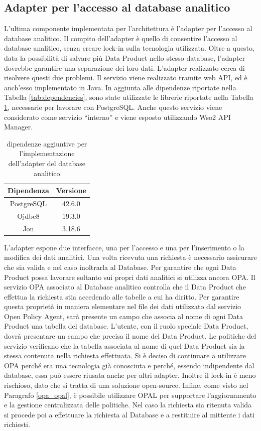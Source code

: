 \documentclass[12pt]{report}
\begin{document}
\subsection{Adapter per l'accesso al database analitico}
L'ultima componente implementata per l'architettura è l'adapter per l'accesso al database analitico.
Il compito dell'adapter è quello di consentire l'accesso al database analitico, senza creare lock-in sulla tecnologia utilizzata.
Oltre a questo, data la possibilità di salvare più Data Product nello stesso database, l'adapter dovrebbe garantire una separazione dei loro dati.
L'adapter realizzato cerca di risolvere questi due problemi.
Il servizio viene realizzato tramite web API, ed è anch'esso implementato in Java.
In aggiunta alle dipendenze riportate nella Tabella \ref{tab:dependencies}, sono state utilizzate le librerie riportate nella Tabella \ref{tab:dependencies2}, necessarie per lavorare con PostgreSQL.
Anche questo servizio viene considerato come servizio ``interno'' e viene esposto utilizzando Wso2 API Manager.
\begin{table}
    \centering
    \begin{tabular}{|c|c|}
        \hline
        Dipendenza & Versione \\
        \hline
        PostgreSQL & 42.6.0 \\
        Ojdbc8 & 19.3.0 \\
        Jon & 3.18.6 \\
        \hline
    \end{tabular}
        \caption{dipendenze aggiuntive per l'implementazione dell'adapter del database analitico}
        \label{tab:dependencies2}
\end{table}
L'adapter espone due interfacce, una per l'accesso e una per l'inserimento o la modifica dei dati analitici.
Una volta ricevuta una richiesta è necessario assicurare che sia valida e nel caso inoltrarla al Database.
Per garantire che ogni Data Product possa lavorare soltanto sui propri dati analitici si utilizza ancora OPA.
Il servizio OPA associato al Database analitico controlla che il Data Product che effettua la richiesta stia accedendo alle tabelle a cui ha diritto.
Per garantire questa proprietà in maniera elementare nel file dei dati utilizzato dal servizio Open Policy Agent, sarà presente un campo che associa al nome di ogni Data Product una tabella del database.
L'utente, con il ruolo speciale Data Product, dovrà presentare un campo che precisa il nome del Data Product.
Le politiche del servizio verificano che la tabella associata al nome di quel Data Product sia la stessa contenuta nella richiesta effettuata.
Si è deciso di continuare a utilizzare OPA perché era una tecnologia già conosciuta e perché, essendo indipendente dal database, essa può essere riusata anche per altri adapter.
Inoltre il lock-in è meno rischioso, dato che si tratta di una soluzione open-source. 
Infine, come visto nel Paragrafo \ref{opa_opal}, è possibile utilizzare OPAL per supportare l'aggiornamento e la gestione centralizzata delle politiche.
Nel caso la richiesta sia ritenuta valida si procede poi a effettuare la richiesta al Database e a restituire al mittente i dati richiesti.
\end{document}
